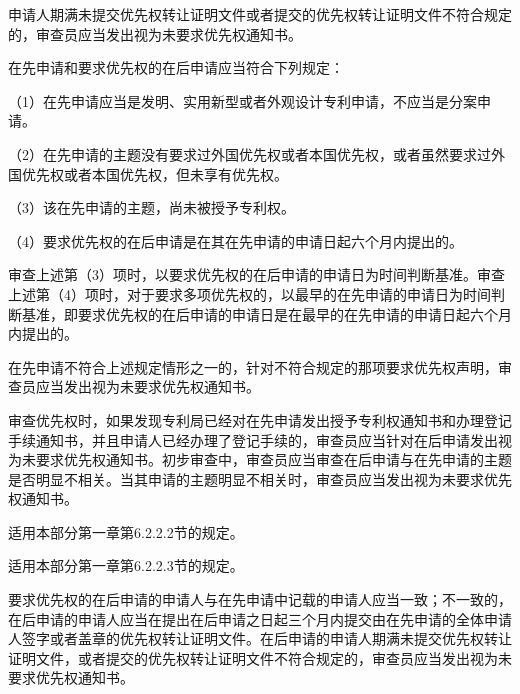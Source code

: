 申请人期满未提交优先权转让证明文件或者提交的优先权转让证明文件不符合规定的，审查员应当发出视为未要求优先权通知书。

在先申请和要求优先权的在后申请应当符合下列规定：

{\setlength{\parindent}{17.1bp}（1）在先申请应当是发明、实用新型或者外观设计专利申请，不应当是分案申请。\par}

{\setlength{\parindent}{17.1bp}（2）在先申请的主题没有要求过外国优先权或者本国优先权，或者虽然要求过外国优先权或者本国优先权，但未享有优先权。\par}

{\setlength{\parindent}{17.1bp}（3）该在先申请的主题，尚未被授予专利权。\par}

{\setlength{\parindent}{17.1bp}（4）要求优先权的在后申请是在其在先申请的申请日起六个月内提出的。\par}

审查上述第（3）项时，以要求优先权的在后申请的申请日为时间判断基准。审查上述第（4）项时，对于要求多项优先权的，以最早的在先申请的申请日为时间判断基准，即要求优先权的在后申请的申请日是在最早的在先申请的申请日起六个月内提出的。

在先申请不符合上述规定情形之一的，针对不符合规定的那项要求优先权声明，审查员应当发出视为未要求优先权通知书。

审查优先权时，如果发现专利局已经对在先申请发出授予专利权通知书和办理登记手续通知书，并且申请人已经办理了登记手续的，审查员应当针对在后申请发出视为未要求优先权通知书。初步审查中，审查员应当审查在后申请与在先申请的主题是否明显不相关。当其申请的主题明显不相关时，审查员应当发出视为未要求优先权通知书。

适用本部分第一章第6.2.2.2节的规定。

适用本部分第一章第6.2.2.3节的规定。

要求优先权的在后申请的申请人与在先申请中记载的申请人应当一致；不一致的，在后申请的申请人应当在提出在后申请之日起三个月内提交由在先申请的全体申请人签字或者盖章的优先权转让证明文件。在后申请的申请人期满未提交优先权转让证明文件，或者提交的优先权转让证明文件不符合规定的，审查员应当发出视为未要求优先权通知书。

